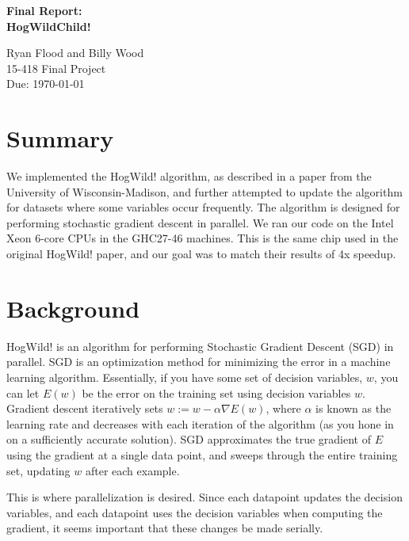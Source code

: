 \documentclass{article}
\newcommand{\grad}{\nabla}
\begin{document}
\thispagestyle{empty}

\begin{center}
\bf\large
Final Report:\\
\Huge
HogWildChild!
\end{center}

\begin{center}
\large
Ryan Flood and Billy Wood\\
15-418 Final Project\\
Due: \today
\end{center}

\clearpage
{}

\tableofcontents

\clearpage
{}

\section{Summary}

We implemented the HogWild! algorithm, as described in a paper
\cite{hogwild} from the 
University of Wisconsin-Madison, and further attempted to update the
algorithm for datasets where some variables occur frequently.
The algorithm is designed for performing stochastic gradient descent in
parallel.
We ran our code on the Intel Xeon 6-core CPUs in the GHC27-46 machines.
This is the same chip used in the original HogWild! paper, and our goal
was to match their results of 4x speedup.

\section{Background}

HogWild! is an algorithm for performing Stochastic Gradient Descent (SGD)
in parallel.
SGD is an optimization method for minimizing the error in a machine
learning algorithm.
Essentially, if you have some set of decision variables, $w$,
you can let $E(w)$ be the error on the training set using decision
variables $w$.
Gradient descent iteratively sets $w := w - \alpha \grad E(w)$,
where $\alpha$ is known as the learning rate and decreases with each
iteration of the algorithm (as you hone in on a sufficiently accurate
solution).
SGD approximates the true gradient of $E$ using the gradient at a single
data point, and sweeps through the entire training set, updating $w$
after each example.

This is where parallelization is desired.
Since each datapoint updates the decision variables,
and each datapoint uses the decision variables when computing the gradient,
it seems important that these changes be made serially.
\end{document}
